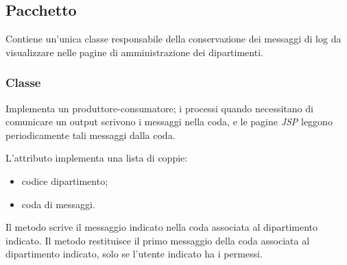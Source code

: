 \documentclass[tesi.tex]{subfiles}
\begin{document}
\subsection{Pacchetto }
Contiene un'unica classe responsabile della conservazione dei messaggi
di log da visualizzare nelle pagine di amministrazione dei
dipartimenti.

\subsubsection{Classe }
\begin{center}
\end{center}
Implementa un produttore-consumatore; i processi quando necessitano di
comunicare un output scrivono i messaggi nella coda, e
le pagine \emph{JSP} leggono periodicamente tali messaggi dalla coda.

L'attributo  implementa una lista di coppie:
\begin{itemize}
\item codice dipartimento;
\item coda di messaggi.
\end{itemize}
Il metodo  scrive il messaggio indicato nella coda
associata al dipartimento indicato. Il metodo  restituisce
il primo messaggio della coda associata al dipartimento indicato, solo
se l'utente indicato ha i permessi.
\end{document}

